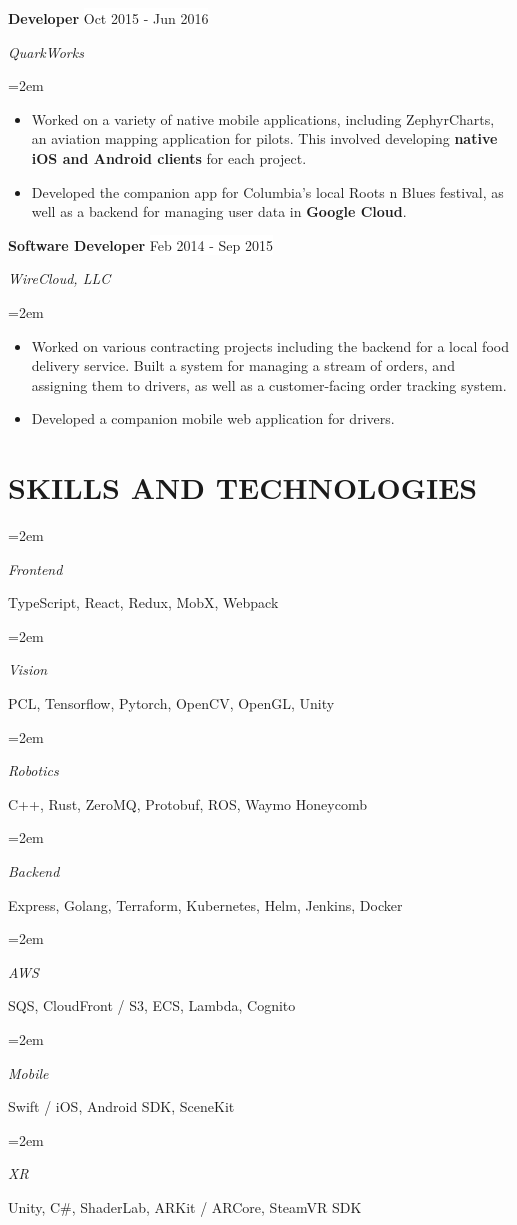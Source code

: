 \documentclass[paper=a4,fontsize=9pt]{scrartcl} %
\newlength{\spacebox}
\newcommand{\sepspace}{\vspace*{0.8em}}		%
\newcommand{\NewPart}[1]{\section*{\uppercase{#1}}}
\newcommand{\PersonalEntry}[2]{
			\noindent\hangindent=2em\hangafter=0 %
			\parbox{\spacebox}{        %
			\textit{#1}}		       %
			\hspace{1.5em} #2 \par}    %
\newcommand{\SkillsEntry}[2]{      %
			\noindent\hangindent=2em\hangafter=0 %
			\parbox{\spacebox}{        %
			\textit{#1}}			   %
			\hspace{1.5em} #2 \par}    %
\newcommand{\EducationEntry}[4]{
			\noindent \textbf{#1} \hfill      %
			\colorbox{Black}{%
				\parbox{6em}{%
				\hfill\color{White}#2}} \par  %
			\noindent \textit{#3} \par        %
			\noindent\hangindent=2em\hangafter=0 \small #4 %
			\normalsize \par}
\newcommand{\WorkEntry}[4]{				  %
			\noindent \textbf{#1} \hfill      %
			\colorbox{White}{\color{Black}#2} \par  %
			\noindent \textit{#3} \par              %
			\noindent\hangindent=2em\hangafter=0 \small #4 %
			\normalsize \par}
\begin{document}
	\WorkEntry{Developer}{Oct 2015 - Jun 2016}{QuarkWorks}{
		\begin{itemize}
			\item Worked on a variety of native mobile applications, including ZephyrCharts, an aviation mapping application for pilots. This involved developing \textbf{native iOS and Android clients} for each project.
			\item Developed the companion app for Columbia's local Roots n Blues festival, as well as a backend for managing user data in \textbf{Google Cloud}.
		\end{itemize}
	}
	\sepspace
	
	\WorkEntry{Software Developer}{Feb 2014 - Sep 2015}{WireCloud, LLC}{
		\begin{itemize}
			\item Worked on various contracting projects including the backend for a local food delivery service. Built a system for managing a stream of orders, and assigning them to drivers, as well as a customer-facing order tracking system. 
			\item Developed a companion mobile web application for drivers.
		\end{itemize}
	}
	\sepspace
	
	\NewPart{Skills and Technologies}{}
	
	\SkillsEntry{Frontend}{TypeScript, React, Redux, MobX, Webpack}
	
	\SkillsEntry{Vision}{PCL, Tensorflow, Pytorch, OpenCV, OpenGL, Unity}
	\SkillsEntry{Robotics}{C++, Rust, ZeroMQ, Protobuf, ROS, Waymo Honeycomb}
	\SkillsEntry{Backend}{Express, Golang, Terraform, Kubernetes, Helm, Jenkins, Docker}
	\SkillsEntry{AWS}{SQS, CloudFront / S3, ECS, Lambda, Cognito}

	\SkillsEntry{Mobile}{Swift / iOS, Android SDK, SceneKit}

	\SkillsEntry{XR}{Unity, C\#, ShaderLab, ARKit / ARCore, SteamVR SDK}
	
	
\end{document}
